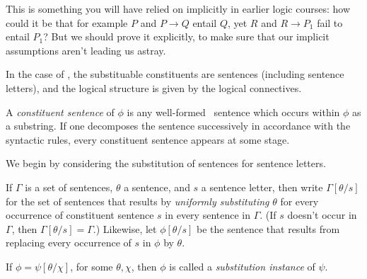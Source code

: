This is something you will have relied on implicitly in earlier logic courses: how could it be that for example $P$ and $P\to Q$ entail $Q$, yet $R$ and $R \to P_{1}$ fail to entail $P_{1}$? But we should prove it explicitly, to make sure that our implicit assumptions aren't leading us astray.

In the case of \lone, the substituable constituents are sentences (including sentence letters), and the logical structure is given by the logical connectives. \begin{definition}
	A \emph{constituent sentence}  of $\phi$ is any well-formed \lone\ sentence which occurs within $\phi$ as a substring. If one decomposes the sentence successively in accordance with the syntactic rules, every constituent sentence appears at some stage. 
\end{definition}
 We begin by considering the substitution of sentences for sentence letters.
\begin{definition}If $\Gamma$ is a set of sentences, $\theta$ a sentence, and $s$ a sentence letter, then write $\Gamma[\theta/s]$ for the set of sentences that results by \emph{uniformly substituting} $\theta$ for every occurrence of constituent sentence $s$ in every sentence in $\Gamma$. (If $s$ doesn't occur in $\Gamma$, then $\Gamma[\theta/s]=\Gamma$.) Likewise, let $\phi[\theta/s]$ be the sentence that results from replacing every occurrence of $s$ in $\phi$ by $\theta$.
\end{definition}

\begin{definition}
	If  $\phi = \psi[\theta/\chi]$, for some $\theta,\chi$, then $\phi$ is called a \emph{substitution instance} of $\psi$.
\end{definition}

